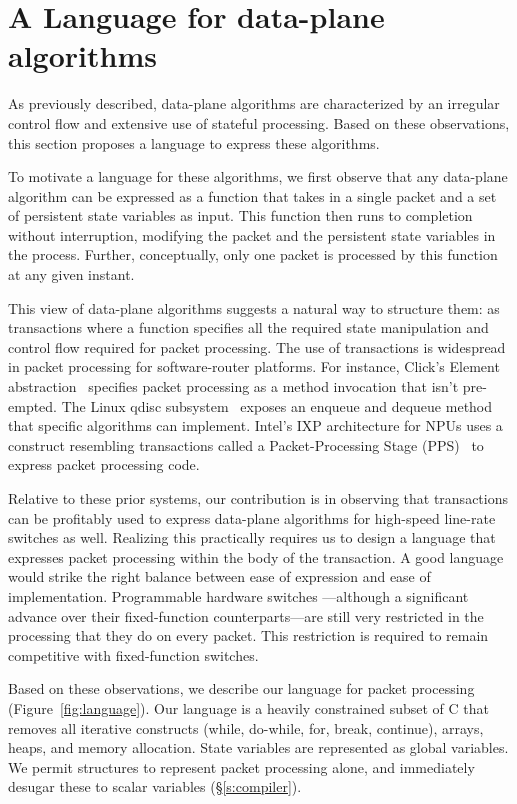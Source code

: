 \section{A Language for data-plane algorithms}
\label{s:language}

As previously described, data-plane algorithms are characterized by an
irregular control flow and extensive use of stateful processing. Based on these
observations, this section proposes a language to express these algorithms.

To motivate a language for these algorithms, we first observe that any
data-plane algorithm can be expressed as a function that takes in a single
packet and a set of persistent state variables as input. This function then
runs to completion without interruption, modifying the packet and the
persistent state variables in the process. Further, conceptually, only one
packet is processed by this function at any given instant.

This view of data-plane algorithms suggests a natural way to structure them: as
transactions where a function specifies all the required state manipulation and
control flow required for packet processing. The use of transactions is
widespread in packet processing for software-router platforms. For instance,
Click's Element abstraction~\cite{kohler_thesis} specifies packet processing as
a method invocation that isn't pre-empted.  The Linux qdisc
subsystem~\cite{qdisc} exposes an enqueue and dequeue method that specific
algorithms can implement. Intel's IXP architecture for NPUs uses a construct
resembling transactions called a Packet-Processing Stage
(PPS)~\cite{intel_pldi} to express packet processing code.

Relative to these prior systems, our contribution is in observing that
transactions can be profitably used to express data-plane algorithms for
high-speed line-rate switches as well. Realizing this practically requires us
to design a language that expresses packet processing within the body of the
transaction. A good language would strike the right balance between ease of
expression and ease of implementation. Programmable hardware switches
---although a significant advance over their fixed-function counterparts---are
still very restricted in the processing that they do on every packet. This
restriction is required to remain competitive with fixed-function switches.

Based on these observations, we describe our language for packet processing
(Figure~\ref{fig:language}). Our language is a heavily constrained subset of C
that removes all iterative constructs (while, do-while, for, break, continue),
arrays, heaps, and memory allocation. State variables are represented as global
variables. We permit structures to represent packet processing alone, and immediately
desugar these to scalar variables (\S\ref{s:compiler}).


